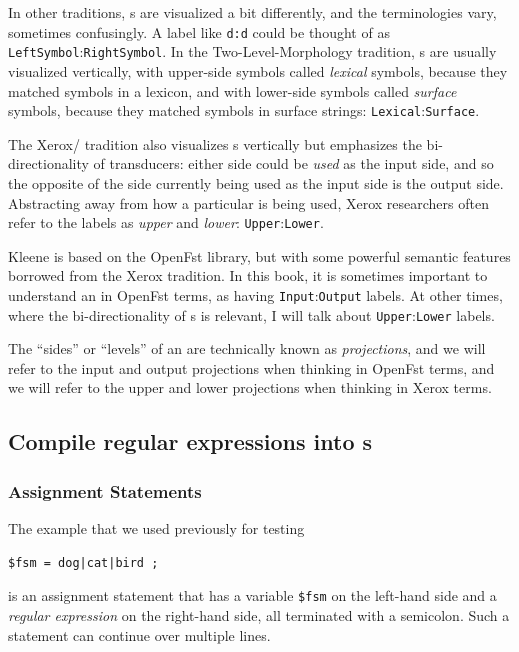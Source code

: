 In other traditions, s are visualized a bit differently, and
the terminologies
vary, sometimes confusingly.  A label like \texttt{d:d} could be thought of as
\texttt{LeftSymbol}:\texttt{RightSymbol}.  In the Two-Level-Morphology tradition,
\fsm{}s are usually  visualized vertically, with upper-side symbols
called \emph{lexical} symbols, because they matched symbols in a lexicon, and
with lower-side symbols called \emph{surface} symbols, because they matched
symbols in surface strings: \texttt{Lexical}:\texttt{Surface}.  

The Xerox/ tradition also visualizes \fsm{}s vertically but
emphasizes the bi-directionality of
transducers: either side could be \emph{used} as the input side, and so the opposite
of the side currently being used as the input side is the output side.  
Abstracting away from how a
particular \fsm{} is being used, Xerox researchers often refer to
the labels as \emph{upper} and \emph{lower}:  \texttt{Upper}:\texttt{Lower}.  

Kleene is based on the OpenFst library, but with some powerful semantic features
borrowed from
the Xerox tradition.  In this book, it is sometimes important to
understand an \fsm{} in OpenFst terms, as having \texttt{Input}:\texttt{Output}
labels.  At other times, where the bi-directionality of \fsm{}s is
relevant, I will talk about \texttt{Upper}:\texttt{Lower} labels. 

The ``sides'' or ``levels'' of an \fsm{} are technically known as \emph{projections}, and we will 
refer to the input and output projections when thinking in OpenFst terms, and we will
refer to the upper and lower projections when thinking in Xerox terms.

\subsection{Compile regular expressions into \fsm{}s}

\subsubsection{Assignment Statements}

The example that we used previously for testing

\begin{Verbatim}
$fsm = dog|cat|bird ;
\end{Verbatim}

\noindent
is an assignment statement that has a variable \verb!$fsm! on the left-hand side and a
\emph{regular expression} on the right-hand side, all terminated with a semicolon.  Such
a statement can continue over multiple lines.

